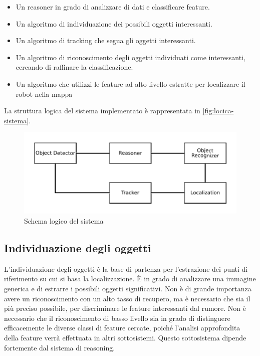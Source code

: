 \begin{itemize}
 \item Un reasoner in grado di analizzare di dati e classificare feature.
 \item Un algoritmo di individuazione dei possibili oggetti interessanti.
 \item Un algoritmo di tracking che segua gli oggetti interessanti.
 \item Un algoritmo di riconoscimento degli oggetti individuati come interessanti, cercando di raffinare la classificazione.
 \item Un algoritmo che utilizzi le feature ad alto livello estratte per localizzare il robot nella mappa
\end{itemize}

La struttura logica del sistema implementato è rappresentata in \autoref{fig:locica-sistema}.

\begin{figure}[ht]
  \includegraphics[width=\textwidth]{diagrammi/SchemaLogico}
  \caption{Schema logico del sistema}
  \label{fig:locica-sistema}
\end{figure}

\subsection{Individuazione degli oggetti}
L'individuazione degli oggetti è la base di partenza per l'estrazione dei punti di riferimento su cui si basa la localizzazione.
\`E in grado di analizzare una immagine generica e di estrarre i possibili oggetti significativi. Non è di grande importanza avere un riconoscimento con un alto tasso di recupero, ma è necessario che sia il più preciso possibile, per discriminare le feature interessanti dal rumore.
Non è necessario che il riconoscimento di basso livello sia in grado di distinguere efficacemente le diverse classi di feature cercate, poiché l'analisi approfondita della feature verrà effettuata in altri sottosistemi.
Questo sottosistema dipende fortemente dal sistema di reasoning.

